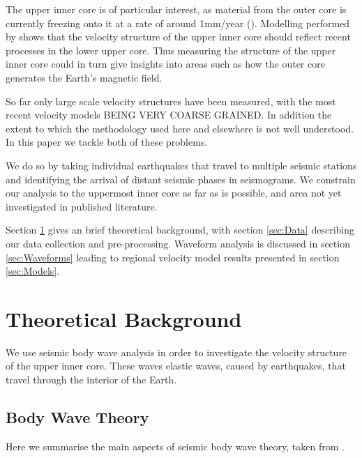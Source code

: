 \documentclass[11pt,a4paper]{article}
\begin{document}
The upper inner core is of particular interest, as material from the outer core is currently freezing onto it at a rate of around 1mm/year (\cite{Labrosse2001}). Modelling performed by \cite{Deguen2009a} shows that the velocity structure of the upper inner core should reflect recent processes in the lower upper core. Thus measuring the structure of the upper inner core could in turn give insights into areas such as how the outer core generates the Earth's magnetic field. 

So far only large scale velocity structures have been measured, with the most recent velocity models BEING VERY COARSE GRAINED. In addition the extent to which the methodology used here and elsewhere is not well understood. In this paper we tackle both of these problems.

We do so by taking individual earthquakes that travel to multiple seismic stations and identifying the arrival of distant seismic phases in seismograms. We constrain our analysis to the uppermost inner core as far as is possible, and area not yet investigated in published literature.

Section \ref{sec:Theory} gives an brief theoretical background, with section \ref{sec:Data} describing our data collection and pre-processing. Waveform analysis is discussed in section \ref{sec:Waveforms} leading to regional velocity model results presented in section \ref{sec:Models}.

\section{Theoretical Background}
\label{sec:Theory}
We use seismic body wave analysis in order to investigate the velocity structure of the upper inner core. These waves elastic waves, caused by earthquakes, that travel through the interior of the Earth.

\subsection{Body Wave Theory}
Here we summarise the main aspects of seismic body wave theory, taken from \cite{Shearer2009}.
\end{document}
